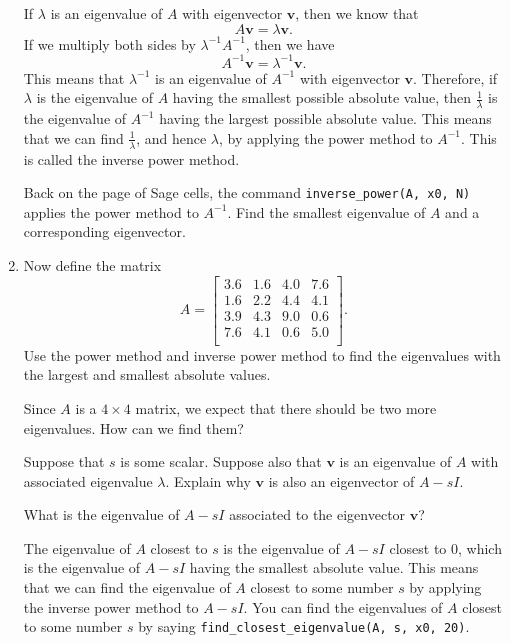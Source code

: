 \documentclass[12pt]{article}
\newcommand{\vs}[1]{\vspace{#1in}}
\newcommand{\vvec}{{\mathbf v}}
\begin{document}
\begin{enumerate}
  If $\lambda$ is an eigenvalue of $A$ with eigenvector $\vvec$, then
  we know that 
  $$
  A\vvec = \lambda\vvec.
  $$
  If we multiply both sides by $\lambda^{-1}A^{-1}$, then we have
  $$
  A^{-1}\vvec = \lambda^{-1}\vvec.
  $$
  This means that $\lambda^{-1}$ is an eigenvalue of $A^{-1}$ with
  eigenvector $\vvec$.  
  Therefore, if $\lambda$ is the eigenvalue of $A$ having the smallest
  possible absolute value, then $\frac1{\lambda}$ is the eigenvalue of
  $A^{-1}$ having the largest possible absolute value.  This means
  that we can find $\frac{1}{\lambda}$, and hence $\lambda$, by
  applying the power method to $A^{-1}$.  This is called the 
  inverse power method.

  Back on the page of Sage cells, the command {\tt inverse\_power(A,
    x0, N)} applies the power method to $A^{-1}$.  Find the smallest
  eigenvalue of $A$ and a corresponding eigenvector.

  \vs{1}
\item Now define the matrix
  $$
  A = \left[
    \begin{array}{cccc}
      3.6 & 1.6 & 4.0 & 7.6 \\
      1.6 & 2.2 & 4.4 & 4.1 \\
      3.9 & 4.3 & 9.0 & 0.6 \\
      7.6 & 4.1 & 0.6 & 5.0 \\
    \end{array}
  \right].
  $$
  Use the power method and inverse power method to find the
  eigenvalues with the largest and smallest absolute values.

  \vs{1}

  Since $A$ is a $4\times4$ matrix, we expect that there should be two
  more eigenvalues.  How can we find them?

  Suppose that $s$ is some scalar.  Suppose also that $\vvec$ is
  an eigenvalue of $A$ with associated 
  eigenvalue $\lambda$.  Explain why $\vvec$ is also an eigenvector of
  $A-sI$.

  \vs{1}
  What is the eigenvalue of $A-sI$ associated to the eigenvector
  $\vvec$? 

  \vs{1}
  The eigenvalue of $A$ closest to $s$ is the eigenvalue
  of $A-sI$ closest to $0$, which is the eigenvalue of $A-sI$ having the
  smallest absolute value.  This means that we can find the eigenvalue
  of $A$ closest to some number $s$ by applying the inverse power
  method to $A-sI$.  You can find the eigenvalues of $A$ closest to
  some number $s$ by saying {\tt find\_closest\_eigenvalue(A, s, x0, 20)}.


\end{enumerate}
\end{document}
